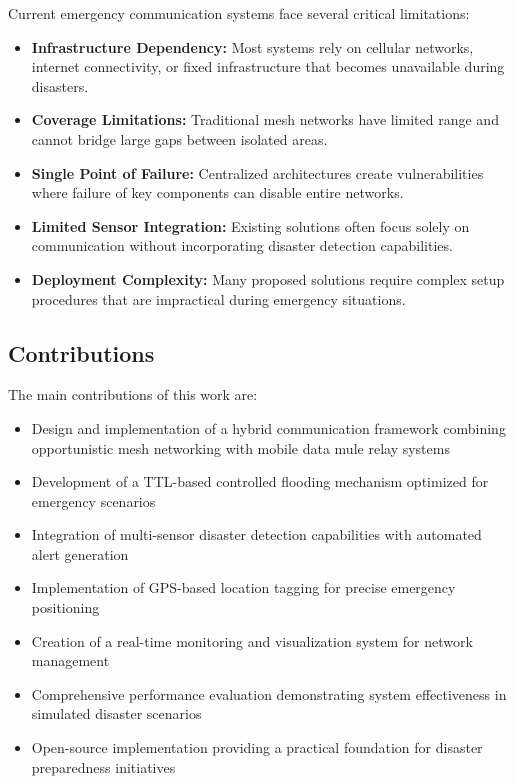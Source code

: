\documentclass[conference]{IEEEtran}
\begin{document}
Current emergency communication systems face several critical limitations:

\begin{itemize}
\item \textbf{Infrastructure Dependency:} Most systems rely on cellular networks, internet connectivity, or fixed infrastructure that becomes unavailable during disasters.
\item \textbf{Coverage Limitations:} Traditional mesh networks have limited range and cannot bridge large gaps between isolated areas.
\item \textbf{Single Point of Failure:} Centralized architectures create vulnerabilities where failure of key components can disable entire networks.
\item \textbf{Limited Sensor Integration:} Existing solutions often focus solely on communication without incorporating disaster detection capabilities.
\item \textbf{Deployment Complexity:} Many proposed solutions require complex setup procedures that are impractical during emergency situations.
\end{itemize}

\subsection{Contributions}

The main contributions of this work are:
\begin{itemize}
\item Design and implementation of a hybrid communication framework combining opportunistic mesh networking with mobile data mule relay systems
\item Development of a TTL-based controlled flooding mechanism optimized for emergency scenarios
\item Integration of multi-sensor disaster detection capabilities with automated alert generation
\item Implementation of GPS-based location tagging for precise emergency positioning
\item Creation of a real-time monitoring and visualization system for network management
\item Comprehensive performance evaluation demonstrating system effectiveness in simulated disaster scenarios
\item Open-source implementation providing a practical foundation for disaster preparedness initiatives
\end{itemize}
\end{document}
